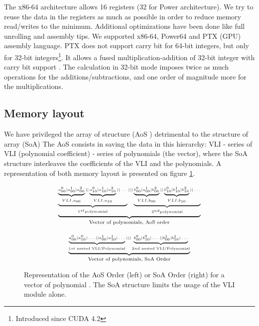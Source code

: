 \documentclass[oribibl]{llncs2e/llncs}
\begin{document}
The x86-64 architecture allows 16 registers (32 for Power architecture). We try to reuse the data in the registers as much as possible in order to reduce memory read/writes to the minimum.  Additional optimizations have been done like full unrolling and assembly tips. We  supported  x86-64, Power64 and PTX (GPU) assembly language.
 PTX does not support carry bit for 64-bit integers, but only for 32-bit integers\footnote{Introduced since CUDA 4.2}.  
It allows a fused multiplication-addition of 32-bit integer  with carry bit support \cite{CUDAasm}. 
The calculation in 32-bit mode imposes twice as much operations for the additions/subtractions, and one order of magnitude more for the multiplications. 

\subsection{Memory layout}

We have privileged the  array  of structure  (AoS ) detrimental to the  structure of array (SoA)
The AoS consists in saving the data in this hierarchy: VLI - series of VLI (polynomial coefficient) - series of polynomials (the vector), where  the SoA structure interleaves the coefficients of the VLI and the polynomials.
A representation of both memory layout is presented on figure \ref{AOSSOA}. 

\begin{figure}
    \begin{minipage}{0.50\linewidth}
        \begin{eqnarray}
        \tiny{
                 \underbrace{
                 \underbrace{ \underbrace{a^0_{00} | a^1_{00} | a^2_{00}}_{VLI, a_{00} } || \underbrace{a^0_{10} | a^1_{10} | a^2_{10}}_{VLI, a_{10}} ||   \dots  }_{1^{st} \textrm{polynomial}} 
                  |||    \underbrace{ \underbrace{b^0_{00} | a^1_{00} | b^2_{00}}_{VLI, b_{00} } || \underbrace{b^0_{10} | b^1_{10} | b^2_{10}}_{VLI, b_{10}} ||   \dots  }_{2^{nd} \textrm{polynomial} } }_{\textrm{Vector of polynomials, AoS order}} \nonumber
            }
        \end{eqnarray}
    \end{minipage}
\begin{minipage}{0.50\linewidth}
    \begin{eqnarray}
    \tiny{
        \underbrace{
        \underbrace{a^0_{00} | a^0_{10} | \dots || a^1_{00} | a^1_{10} | \dots  }_{1st  \textrm{ nested VLI/Polynomial} } |||  \underbrace{b^0_{00} | b^0_{10} | \dots || b^1_{00} | b^1_{10} | \dots  }_{2nd  \textrm{ nested VLI/Polynomial} }
        }_{\textrm{Vector of polynomials, SoA Order}} \nonumber }
        \end{eqnarray}
\end{minipage}
\caption{Representation of the AoS Order (left) or SoA Order (right) for a vector of polynomial \label{AOSSOA}.  The SoA structure limits the usage of the VLI module alone.}
\end{figure}
\end{document}
